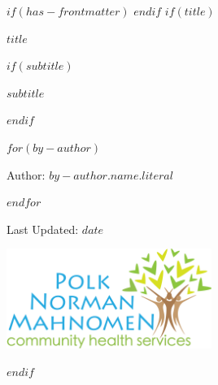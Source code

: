 $if(has-frontmatter)$
\frontmatter
$endif$
$if(title)$
\cleardoublepage
\thispagestyle{empty}
{\centering
\vspace*{1cm} %
{\Huge\bfseries $title$ \par}

$if(subtitle)$
\vspace{3ex}
{\Large\bfseries $subtitle$ \par}
$endif$
 
$for(by-author)$
\vspace{3ex} %
{\Large Author: $by-author.name.literal$ \par}
$endfor$
\vspace{3ex} %
{\Large Last Updated: $date$ \par}

\vspace{6ex} %
\begin{center}
  \includegraphics[width=0.5\textwidth]{pages/Attachments/logo_PNM.png}
\end{center}

}
$endif$
